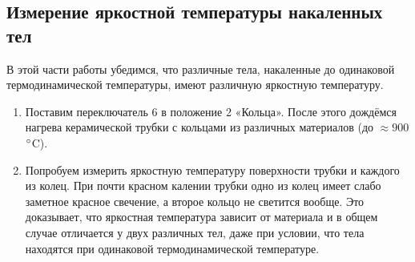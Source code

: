 \documentclass[a4paper,12pt]{article}
\begin{document}
\subsection{Измерение яркостной температуры накаленных тел}
В этой части работы убедимся, что различные тела, накаленные до одинаковой термодинамической температуры, имеют различную яркостную температуру.
\begin{enumerate}
    \item
    Поставим переключатель 6  в положение 2 «Кольца». После этого дождёмся нагрева керамической трубки с кольцами из различных материалов (до $\approx 900$ $\degree$C).
    \item
    Попробуем измерить яркостную температуру поверхности трубки и каждого из колец. При почти красном калении трубки одно из колец имеет слабо заметное красное свечение, а второе кольцо не светится вообще. Это доказывает, что яркостная температура зависит от материала и в общем случае отличается у двух различных тел, даже при условии, что тела находятся при одинаковой термодинамической температуре. 
\end{enumerate}
\end{document}
